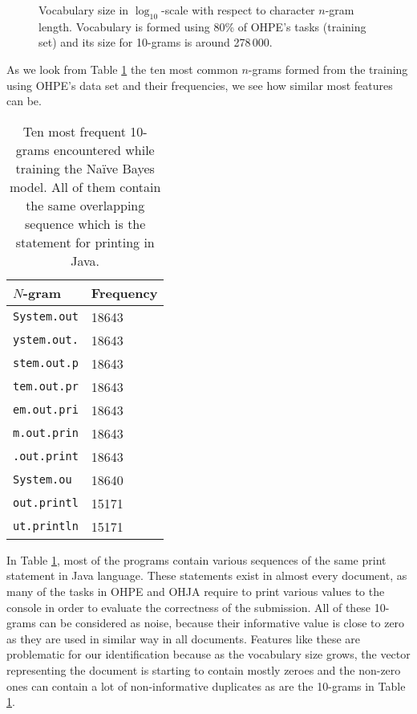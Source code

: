 \newpage

\begin{figure}[ht]
    \centering
    \setlength\figureheight{5cm}
    \setlength{}
    
    \caption{Vocabulary size in $\log_{10}$-scale with respect to character $n$-gram length. Vocabulary is formed using 80\% of OHPE's tasks (training set) and its size for 10-grams is around 278\,000.}
    \label{fig-ai-ohpe-ngram-voc}
\end{figure}


As we look from Table \ref{tbl-ai-result-topten-ngrams} the ten most common $n$-grams formed from the training using OHPE's data set and their frequencies, we see how similar most features can be. 

\begin{table}[ht]
    \centering
    \caption{Ten most frequent 10-grams encountered while training the Naïve Bayes model. All of them contain the same overlapping sequence which is the statement for printing in Java.}
    \begin{tabular}{|m{4cm}|l|}
    \hline
    \textbf{$N$-gram} & \textbf{Frequency} \\ \hline
    \texttt{System.out}     & 18643              \\ \hline
    \texttt{ystem.out.}     & 18643              \\ \hline
    \texttt{stem.out.p}     & 18643              \\ \hline
    \texttt{tem.out.pr}     & 18643              \\ \hline
    \texttt{em.out.pri}     & 18643              \\ \hline
    \texttt{m.out.prin}     & 18643              \\ \hline
    \texttt{.out.print}     & 18643              \\ \hline
    \texttt{System.ou}      & 18640              \\ \hline
   \texttt{out.printl}     & 15171              \\ \hline
    \texttt{ut.println}     & 15171              \\ \hline
    \end{tabular}
    \label{tbl-ai-result-topten-ngrams}
\end{table}

\noindent
In Table \ref{tbl-ai-result-topten-ngrams}, most of the programs contain various sequences of the same print statement in Java language. These statements exist in almost every document, as many of the tasks in OHPE and OHJA require to print various values to the console in order to evaluate the correctness of the submission. All of these  10-grams can be considered as noise, because their informative value is close to zero as they are used in similar way in all documents. Features like these are problematic for our identification because as the vocabulary size grows, the vector representing the document is starting to contain mostly zeroes and the non-zero ones can contain a lot of non-informative duplicates as are the 10-grams in Table \ref{tbl-ai-result-topten-ngrams}.

